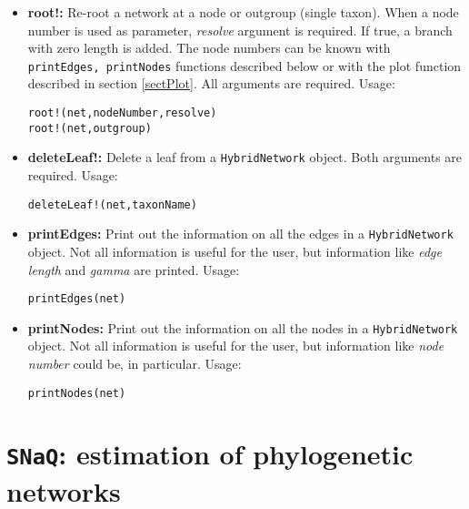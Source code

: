 \documentclass[12pt]{article}
\begin{document}
\begin{itemize}
\item \textbf{root!:} Re-root a network at a node or outgroup (single
  taxon). When a node number is used as parameter, \textit{resolve}
  argument is required. If true, a branch with zero length is
  added. The node numbers can be known with \texttt{printEdges,
    printNodes} functions described below or with the plot function
  described in section \ref{sectPlot}. All arguments are required.
  Usage:
\begin{lstlisting}
root!(net,nodeNumber,resolve)
root!(net,outgroup)
\end{lstlisting}

\item \textbf{deleteLeaf!:} Delete a leaf from a
  \texttt{HybridNetwork} object. Both arguments are required.
Usage:
\begin{lstlisting}
deleteLeaf!(net,taxonName)
\end{lstlisting}


\item \textbf{printEdges:} Print out the information on
  all the edges in a
  \texttt{HybridNetwork} object. Not all information is useful for the
  user, but information like \textit{edge length} and \textit{gamma}
  are printed.
Usage:
\begin{lstlisting}
printEdges(net)
\end{lstlisting}


\item \textbf{printNodes:} Print out the information on
  all the nodes in a
  \texttt{HybridNetwork} object. Not all information is useful for the
  user, but information like \textit{node number}
  could be, in particular.
Usage:
\begin{lstlisting}
printNodes(net)
\end{lstlisting}

\end{itemize}

\section{\texttt{SNaQ}: estimation of phylogenetic networks}
\end{document}
